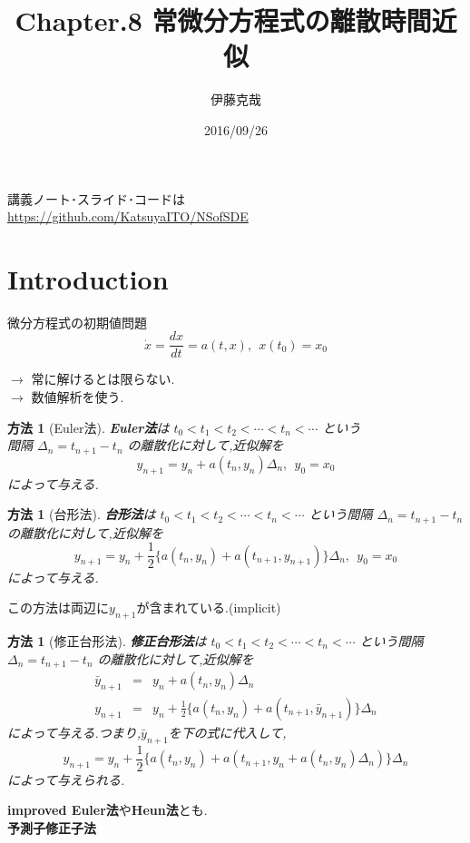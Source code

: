 \documentclass[dvipdfmx,cjk]{beamer}
\numberwithin{equation}{section}
\newtheorem{Method}[Thm]{方法}
\def\method{\begin{Method}}
\def\methodx{\end{Method}}
\def\eq{\begin{equation}}
\def\eqx{\end{equation}}
\def\eqa{\begin{eqnarray}}
\def\eqax{\end{eqnarray}}
\begin{document}
\title[Chap8]{Chapter.8 常微分方程式の離散時間近似} 
\author[Katsuya ITO]{伊藤克哉} 
\date{2016/09/26}

\begin{frame}
\titlepage    
\end{frame}
\begin{frame}
講義ノート･スライド･コードは\\
\url{https://github.com/KatsuyaITO/NSofSDE}
\end{frame}
\begin{frame}
\tableofcontents
\end{frame}
\section{Introduction}
\begin{frame}
\begin{block}{微分方程式の初期値問題}
\[
\dot{x} = \frac{dx}{dt} = a(t,x), \  \  x(t_0) = x_0
\]
\end{block}

$\to$ 常に解けるとは限らない.\\
$\to$ 数値解析を使う.
\end{frame}

\begin{frame}

\method[Euler法]
{\bf Euler法}は $ t_0 < t_1 < t_2 < \cdots < t_n < \cdots $ という\\
間隔 $\Delta_n = t_{n+1} - t_{n}$ の離散化に対して,近似解を
\eq
\label{eq2}
y_{n+1} = y_n + a(t_n,y_n)\Delta_n,\  \  y_0 = x_0
\eqx
によって与える.
\methodx
\end{frame}

\begin{frame}

\method[台形法]
{\bf 台形法}は $ t_0 < t_1 < t_2 < \cdots < t_n < \cdots $ という間隔 $\Delta_n = t_{n+1} - t_{n}$ の離散化に対して,近似解を
\eq
\label{eq3}
y_{n+1} = y_n + \frac{1}{2} \{ a(t_n,y_n) + a(t_{n+1},y_{n+1}) \} \Delta_n,\  \  y_0 = x_0
\eqx
によって与える.
\methodx
この方法は両辺に$y_{n+1}$が含まれている.(implicit)
\end{frame}

\begin{frame}
\method[修正台形法]
{\bf 修正台形法}は $ t_0 < t_1 < t_2 < \cdots < t_n < \cdots $ という間隔 $\Delta_n = t_{n+1} - t_{n}$ の離散化に対して,近似解を
\eqa
\label{eq4}
\bar{y}_{n+1} &=& y_n + a(t_n,y_n)\Delta_n  \\
\label{eq5}
y_{n+1} &=& y_n + \frac{1}{2} \{ a(t_n,y_n) + a(t_{n+1},\bar{y}_{n+1}) \} \Delta_n 
\eqax
によって与える.つまり,$\bar{y}_{n+1}$を下の式に代入して,
\eq
\label{eq6}
y_{n+1} = y_n + \frac{1}{2} \{ a(t_n,y_n) + a(t_{n+1},y_n + a(t_n,y_n)\Delta_n) \} \Delta_n
\eqx
によって与えられる.
\methodx
{\bf improved Euler法}や{\bf Heun法}とも.\\
{\bf 予測子修正子法}
\end{frame}
\end{document}
